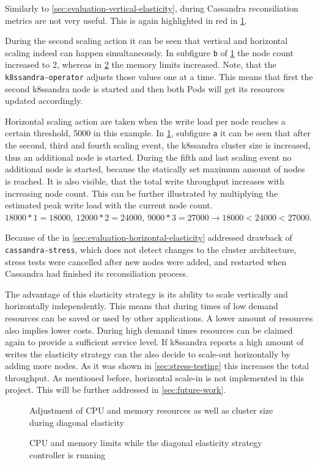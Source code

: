 Similarly to \cref{sec:evaluation-vertical-elasticity}, during Cassandra reconsiliation metrics are not very useful. This is again highlighted in red in \cref{fig:diagonal-elasticity}.

During the second scaling action it can be seen that vertical and horizontal scaling indeed can happen simultaneously. In subfigure \texttt{b} of \cref{fig:diagonal-elasticity} the node count increased to 2, whereas in \cref{fig:diagonal-elasticity-limits} the memory limits increased. Note, that the \texttt{k8ssandra-operator} adjusts those values one at a time. This means that first the second k8ssandra node is started and then both Pods will get its resources updated accordingly.

Horizontal scaling action are taken when the write load per node reaches a certain threshold, 5000 in this example. In \cref{fig:diagonal-elasticity}, subfigure \texttt{a} it can be seen that after the second, third and fourth scaling event, the k8ssandra cluster size is increased, thus an additional node is started. During the fifth and last scaling event no additional node is started, because the statically set maximum amount of nodes is reached. It is also visible, that the total write throughput increases with increasing node count. This can be further illustrated by multiplying the estimated peak write load with the current node count. \(18000 * 1 = 18000,\ 12000 * 2 = 24000,\ 9000 * 3 = 27000 \rightarrow 18000 < 24000 < 27000\).

Because of the in \cref{sec:evaluation-horizontal-elasticity} addressed drawback of \texttt{cassandra-stress}, which does not detect changes to the cluster architecture, stress tests were cancelled after new nodes were added, and restarted when Cassandra had finished its reconsiliation process.

The advantage of this elasticity strategy is its ability to scale vertically and horizontally independently. This means that during times of low demand resources can be saved or used by other applications. A lower amount of resources also implies lower costs. During high demand times resources can be claimed again to provide a sufficient service level. If k8ssandra reports a high amount of writes the elasticity strategy can the also decide to scale-out horizontally by adding more nodes. As it was shown in \cref{sec:stress-testing} this increases the total throughput. As mentioned before, horizontal scale-in is not implemented in this project. This will be further addressed in \cref{sec:future-work}.

\begin{figure}
    \centering
    
    \caption{Adjustment of CPU and memory resources as well as cluster size during diagonal elasticity}
    \label{fig:diagonal-elasticity}
\end{figure}

\begin{figure}
    \centering
    
    \caption{CPU and memory limits while the diagonal elasticity strategy controller is running}
    \label{fig:diagonal-elasticity-limits}
\end{figure}
